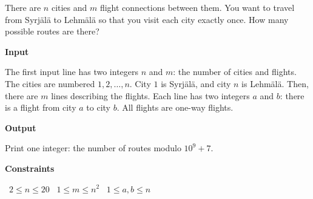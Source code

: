 There are $n$ cities and $m$ flight connections between them. You want to travel from Syrjälä to Lehmälä so that you visit each city exactly once. How many possible routes are there?

\vspace{0.3cm}\noindent\textbf{Input}

The first input line has two integers $n$ and $m$: the number of cities and flights. The cities are numbered $1,2,\dots,n$. City $1$ is Syrjälä, and city $n$ is Lehmälä.
Then, there are $m$ lines describing the flights. Each line has two integers $a$ and $b$: there is a flight from city $a$ to city $b$. All flights are one-way flights.

\vspace{0.3cm}\noindent\textbf{Output}

Print one integer: the number of routes modulo $10^9+7$.

\vspace{0.3cm}\noindent\textbf{Constraints}

\textbullet\ $2 \le n \le 20$
\textbullet\ $1 \le m \le n^2$
\textbullet\ $1 \le a,b \le n$